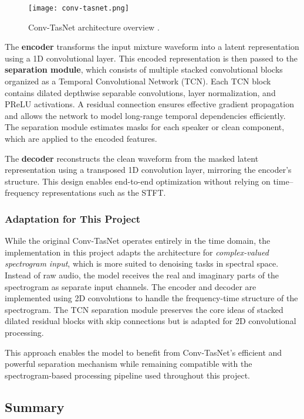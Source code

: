 \begin{figure}[h]
    \centering
    \texttt{[image: conv-tasnet.png]}
    \caption{\label{fig:convtasnet}Conv-TasNet architecture overview \cite{luo2019conv}.}
\end{figure}

The \textbf{encoder} transforms the input mixture waveform into a latent representation using a 1D convolutional layer. This encoded representation is then passed to the \textbf{separation module}, which consists of multiple stacked convolutional blocks organized as a Temporal Convolutional Network (TCN). Each TCN block contains dilated depthwise separable convolutions, layer normalization, and PReLU activations. A residual connection ensures effective gradient propagation and allows the network to model long-range temporal dependencies efficiently. The separation module estimates masks for each speaker or clean component, which are applied to the encoded features.

The \textbf{decoder} reconstructs the clean waveform from the masked latent representation using a transposed 1D convolution layer, mirroring the encoder’s structure. This design enables end-to-end optimization without relying on time--frequency representations such as the STFT.

\subsubsection*{Adaptation for This Project}

While the original Conv-TasNet operates entirely in the time domain, the implementation in this project adapts the architecture for \textit{complex-valued spectrogram input}, which is more suited to denoising tasks in spectral space. Instead of raw audio, the model receives the real and imaginary parts of the spectrogram as separate input channels. The encoder and decoder are implemented using 2D convolutions to handle the frequency-time structure of the spectrogram. The TCN separation module preserves the core ideas of stacked dilated residual blocks with skip connections but is adapted for 2D convolutional processing.

This approach enables the model to benefit from Conv-TasNet’s efficient and powerful separation mechanism while remaining compatible with the spectrogram-based processing pipeline used throughout this project.


\subsection*{Summary}

